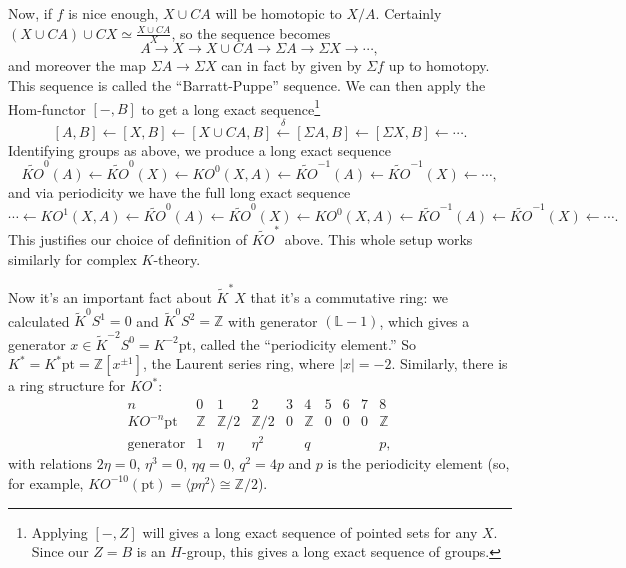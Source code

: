 \documentclass{article}
\newcommand{\Z}{\mathbb{Z}}
\newcommand{\bundle}[1]{\mathbb{#1}}
\newcommand{\ptspace}{\mathrm{pt}}
\newcommand{\Suspend}{\Sigma}
\newcommand{\from}{\leftarrow}
\begin{document}
Now, if $f$ is nice enough, $X \cup CA$ will be homotopic to $X / A$.  Certainly $(X \cup CA) \cup CX \simeq \frac{X \cup CA}{X}$, so the sequence becomes
\[
A \to X \to X \cup CA \to \Suspend A \to \Suspend X \to \cdots
,\]
and moreover the map $\Suspend A \to \Suspend X$ can in fact by given by $\Sigma f$ up to homotopy.  This sequence is called the ``Barratt-Puppe'' sequence.  We can then apply the Hom-functor $[-, B]$ to get a long exact sequence\footnote{Applying $[-, Z]$ will gives a long exact sequence of pointed sets for any $X$.  Since our $Z = B$ is an $H$-group, this gives a long exact sequence of groups.}
\[
[A, B] \from [X, B] \from [X \cup CA, B] \stackrel{\delta}{\from} [\Suspend A, B] \from [\Suspend X, B] \from \cdots
.\]
Identifying groups as above, we produce a long exact sequence
\[
\widetilde{KO}^0 (A) \from \widetilde{KO}^0(X) \from KO^0(X, A) \from \widetilde{KO}^{-1}(A) \from \widetilde{KO}^{-1}(X) \from \cdots
,\]
and via periodicity we have the full long exact sequence
\[
\cdots \from KO^1(X, A) \from \widetilde{KO}^0 (A) \from \widetilde{KO}^0(X) \from KO^0(X, A) \from \widetilde{KO}^{-1}(A) \from \widetilde{KO}^{-1}(X) \from \cdots
.\]
This justifies our choice of definition of $\widetilde{KO}^*$ above.  This whole setup works similarly for complex $K$-theory.

Now it's an important fact about $\widetilde K^* X$ that it's a commutative ring: we calculated $\widetilde K^0 S^1 = 0$ and $\widetilde K^0 S^2 = \Z$ with generator $(\bundle{L} - 1)$, which gives a generator $x \in \widetilde K^{-2} S^0 = K^{-2} \ptspace$, called the ``periodicity element.''  So $K^* = K^* \ptspace = \Z[x^{\pm 1}]$, the Laurent series ring, where $|x| = -2$.  Similarly, there is a ring structure for $KO^*$:
\[
\begin{array}{c|ccccccccc}
n & 0 & 1 & 2 & 3 & 4 & 5 & 6 & 7 & 8 \\
\hline
KO^{-n} \ptspace & \Z & \Z/2 & \Z/2 & 0 & \Z & 0 & 0 & 0 & \Z \\
\mathrm{generator} & 1 & \eta & \eta^2 & & q & & & & p,
\end{array}
\]
with relations $2\eta = 0$, $\eta^3 = 0$, $\eta q = 0$, $q^2 = 4p$ and $p$ is the periodicity element (so, for example, $KO^{-10}(\ptspace) = \langle p\eta^2 \rangle \cong \Z/2$).
\end{document}
